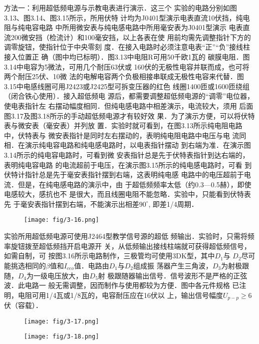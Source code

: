 方法一：利用超低频电源与示教电表进行演示．这三个
实验的电路分别如图3.13、图3.14、图3.15所示，所用伏特
计均为J0401型演示电表直流10伏挡，纯电阻与纯电容电路
中所用微安表与纯电感电路中所用毫安表为J0401型演示
电表直流200微安挡（检流计）和100毫安挡，以上各表在使
用前均需先调整指针下方的调零旋钮，使指针位于中央零刻
度．在接入电路时必须注意电表“正”“负”接线柱接入位置正
确（图中均已标明）．图3.13中电阻R可用50千欧1瓦的
碳膜电阻．图3.14中电容为5微法，可用几个耐压63伏或
160伏的无极性电容并联而成，也可将两个耐压25伏、10微
法的电解电容两个负极相接串联成无极性电容来代替．图
3.15中电感线圈可用J2423或J2425型可拆变压器的红色
线圈1400匝或1600匝绕组（闭合铁心使用）．接入超低频电
源后，都需要调整超低频电源的“调零”电位器，使电表指针左
右摆动幅度相同．但纯电感电路中相差演示，电流较大，须用
后面图3.17及图3.18所示的手动超低频电源才有较好效
果．为了演示方便，可以将伏特表与微安表（毫安表）并列放
置．实验时就可看到，在图3.13所示纯电阻电路中，伏特表与
微安表指针是同时左右摆动的，表明纯电阻电路中电压与电
流同相．在演示纯电容电路和纯电感电路时，以电表指针摆动
到右端为准．在演示图3.14所示的纯电容电路时，可看到微
安表指针总是先于伏特表指针到达右端的，表明纯电容电路
的电流超前于电压，在演示图3.15所示的纯电感电路时，可看
到伏特计指针总是先于毫安表指针摆到右端，这表明纯电感
电路中的电压超前于电流．但是，在纯电感电路的演示中，由
于超低频频率太低（约0.3—0.5赫），即使电感较大，感抗也不
是很大，而且线圈电阻不能忽略．实验中，只能看到伏特表先
于毫安表指针摆到右端，不能演示出相差$90^{\circ}$, 即差1/4周期．

\begin{figure}[htp]
    \centering
\texttt{[image: fig/3-16.png]}
    \caption{}
\end{figure}

实验所用超低频电源可使用J2464型教学信号源的超低
频输出．实验时，只需将频率旋钮拨至超低频挡开启电源开
关，从低频输出接线柱端就可获得超低频信号，如需自制，可
按图3.16所示电路制作，三极管均可使用3DK型，其中$D_1$与
$D_2$尽可能挑选相同的$\beta$值和$I_{ceo}$值．电路由$D_1$与$D_2$组成振
荡器产生三角波，$D_3$为射极跟随，$D_4$为一级电压放大，由$D_5$射
极跟随器输出信号．信号波形不是严格的正弦波．此电路一
般无需调整，因而制作与使用都较为方便．图中各元件规格
已注明，电阻可用1/4瓦或1/8瓦的，电容耐压应在16伏以
上，输出信号幅度$U_{p-p}\ge 6$伏（容载）．

\begin{figure}[htp]
    \centering
\texttt{[image: fig/3-17.png]}
    \caption{}
\end{figure}

\begin{figure}[htp]
    \centering
\texttt{[image: fig/3-18.png]}
    \caption{}
\end{figure}

